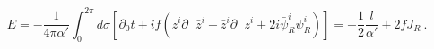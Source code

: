 \begin{equation}
 E = - \frac{1}{4 \pi \alpha '} \int^{2\pi}_0 d \sigma [ \partial_0 t 
     +  i f (z^i \partial_- \bar{z}^i 
     - \bar{z}^i \partial_- z^i  + 2 i \bar{\psi}^i_R \psi^i_R ) ] 
   = - \frac{1}{2} \frac{l}{\alpha '} + 2 f J_R ~.
\label{E}
\end{equation}

